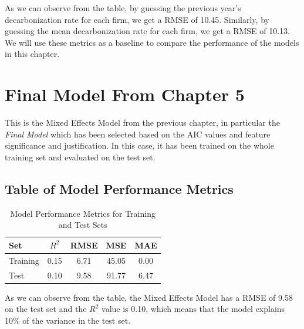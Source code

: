 

\noindent As we can observe from the table, by guessing the previous year's decarbonization rate for each firm, we get a RMSE of 10.45. Similarly, by guessing the mean decarbonization rate for each firm, we get a RMSE of 10.13. We will use these metrics as a baseline to compare the performance of the models in this chapter.

\section{Final Model From Chapter 5}
This is the Mixed Effects Model from the previous chapter, in particular the \textit{Final Model} which has been selected based on the AIC values and feature significance and justification. In this case, it has been trained on the whole training set and evaluated on the test set.

\subsection{Table of Model Performance Metrics}
\begin{table}[H]
    \centering
    \caption{Model Performance Metrics for Training and Test Sets}
    \label{tab:model_performance}
    \begin{tabular}{lcccc}
    \hline
    Set & $R^2$ & RMSE & MSE & MAE \\ 
    \hline
    Training & 0.15 & 6.71 & 45.05 & 0.00 \\
    Test & 0.10 & 9.58 & 91.77 & 6.47 \\
    \hline
    \end{tabular}
\end{table}    

\noindent As we can observe from the table, the Mixed Effects Model has a RMSE of 9.58 on the test set and the $R^2$ value is 0.10, which means that the model explains 10\% of the variance in the test set. 
